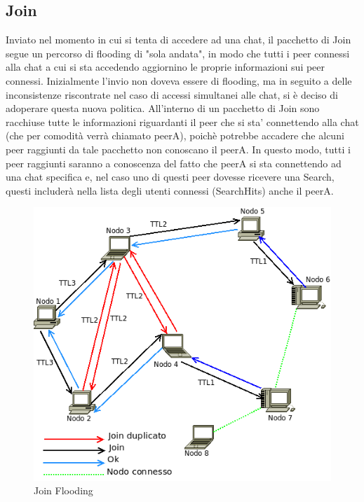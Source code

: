 \subsection{Join}
Inviato nel momento in cui si tenta di accedere ad una chat, il pacchetto di Join segue un percorso di flooding di "sola andata", in modo che tutti i peer connessi alla chat a cui si sta accedendo aggiornino le proprie informazioni sui peer connessi. Inizialmente l'invio non doveva essere di flooding, ma in seguito a delle inconsistenze riscontrate nel caso di accessi simultanei alle chat, si è deciso di adoperare questa nuova politica. All'interno di un pacchetto di Join sono racchiuse tutte le informazioni riguardanti il peer che si sta' connettendo alla chat (che per comodità verrà chiamato peerA), poichè potrebbe accadere che alcuni peer raggiunti da tale pacchetto non conoscano il peerA. In questo modo, tutti i peer raggiunti saranno a conoscenza del fatto che peerA si sta connettendo ad una chat specifica e, nel caso uno di questi peer dovesse ricevere una Search, questi includerà nella lista degli utenti connessi (SearchHits) anche il peerA.
\begin{figure}[H]
\begin{center}
\includegraphics[scale=0.5]{etc/Join.png}
\caption{Join Flooding}
\label{joinflooding}
\end{center}
\end{figure}
